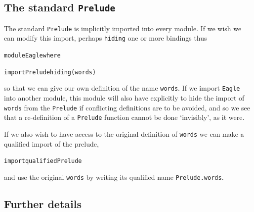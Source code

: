 



\subsection*{The standard \texttt{Prelude}}

The standard \texttt{Prelude} is implicitly imported into
every module. If we wish we can modify this import, perhaps
\texttt{hiding} one or more bindings thus
\begin{alltt}
module Eagle where

import Prelude hiding (words)
\end{alltt}
so that we can give our own definition of the name \texttt{words}. If we
import \texttt{Eagle}
into another module, this module will also have explicitly to hide the import of
\texttt{words} from the \texttt{Prelude} if conflicting definitions are to be avoided, and
so we see that a re-definition of a \texttt{Prelude} function cannot be
done `invisibly', as it were. 

If we also wish to have access to the original definition of \texttt{words}
we can make a qualified import of the prelude,
\begin{alltt}
import qualified Prelude
\end{alltt}
and use the original \texttt{words} by writing its qualified name
\texttt{Prelude.words}.

\subsection*{Further details}

